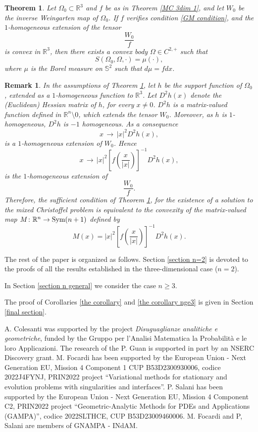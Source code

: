\documentclass[12pt]{amsart}
\newtheorem{thm}{Theorem}[section]
\newtheorem{remark}[theorem]{Remark}
\newcommand{\R}{\mathbb R}
\newcommand{\1}{\mathbf 1}
\newcommand{\s}{\mathbb S}
\begin{document}
\begin{thm}\label{MC 3dim} Let $\Omega_0\subset\R^3$ and $f$ be as in Theorem \ref{MC 3dim 1}, and let $W_0$ be the inverse Weingarten map of $\Omega_0$. If $f$ verifies condition \eqref{GM condition}, and the $1$-homogeneous extension of the tensor 
$$
\frac{W_0}{f}
$$
is convex in $\R^3$, then there exists a convex body $\Omega\in C^{2,+}$ such that
$$
S(\Omega_0,\Omega,\cdot)=\mu(\cdot),
$$
where $\mu$ is the Borel measure on $\s^2$ such that $d\mu=f dx$.
\end{thm}

\begin{remark} In the assumptions of Theorem \ref{MC 3dim}, let $h$ be the support function of $\Omega_0$, extended as a $1$-homogeneous function to $\R^3$. Let $D^2 h(x)$ denote the (Euclidean) Hessian matrix of $h$, for every $x\ne0$. $D^2h$ is a matrix-valued function defined in $\R^n\setminus{0}$, which extends the tensor $W_0$. Moreover, as $h$ is $1$-homogeneous, $D^2h$ is $-1$ homogeneous. As a consequence
$$
x\,\rightarrow\,|x|^2 D^2h(x),
$$
is a $1$-homogeneous extension of $W_0$. Hence 
$$
x\,\rightarrow\,|x|^2 \left[f\left(\frac x{|x|}\right)\right]^{-1}D^2h(x),
$$
is the $1$-homogeneous extension of 
$$
\frac{W_0}{f}.
$$
Therefore, the sufficient condition of Theorem \ref{MC 3dim}, for the existence of a solution to the mixed Christoffel problem is equivalent to the convexity of the matrix-valued map $M\colon\R^n\to{\rm Sym}(n+1)$ defined by
$$
M(x)=|x|^2 \left[f\left(\frac x{|x|}\right)\right]^{-1}D^2h(x).
$$
\end{remark}

The rest of the paper is organized as follows. 
Section \ref{section n=2} is devoted to the proofs of all the results established in the three-dimensional case ($n=2$).

In Section \ref{section n general} we consider the case $n\ge3$.

The proof of Corollaries \ref{the corollary} and \ref{the corollary nge3} is given in Section \ref{final section}.

\medskip

 A. Colesanti was supported by the project {\em Disuguaglianze analitiche e geome\-triche}, funded by the Gruppo per l'Analisi Matematica la Probabilit\`a e le loro Applicazioni. The research of the P. Guan is supported in part by an NSERC Discovery grant. M. Focardi has been supported by the European Union - Next Generation EU, Mission 4 Component 1 CUP B53D2300930006, codice 
2022J4FYNJ, PRIN2022 project ``Variational methods for stationary and evolution problems with singularities and interfaces''. P. Salani has been supported by the European Union - Next Generation EU, Mission 4 Component C2, PRIN2022 project ``Geometric-Analytic Methods for PDEs and Applications (GAMPA)'',  codice 
2022SLTHCE, CUP B53D23009460006. M. Focardi and P, Salani are members of GNAMPA - INdAM.
\end{document}

